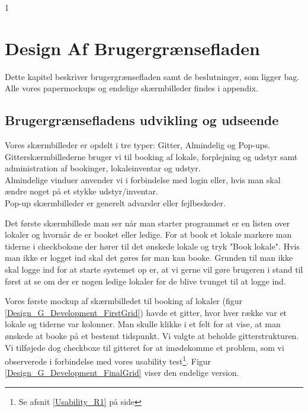 1\chapter{Design Af Brugergrænsefladen}
\label{Design_G}
Dette kapitel beskriver brugergrænsefladen samt de beslutninger, som ligger bag. Alle vores papermockups og endelige skærmbilleder findes i appendix.

\section{Brugergrænsefladens udvikling og udseende}
\label{Design_G_Development}
Vores skærmbilleder er opdelt i tre typer: Gitter, Almindelig og Pop-ups. 
\\Gitterskærmbillederne bruger vi til booking af lokale, forplejning og udstyr samt administration af bookinger, lokaleinventar og udstyr.
\\Almindelige vinduer anvender vi i forbindelse med login eller, hvis man skal ændre noget på et stykke udstyr/inventar.
\\Pop-up skærmbilleder er generelt advarsler eller fejlbeskeder.

Det første skærmbillede man ser når man starter programmet er en listen over lokaler og hvornår de er booket eller ledige. For at book et lokale markere man tiderne i checkboksne der hører til det ønskede lokale og tryk "Book lokale". Hvis man ikke er logget ind skal det gøres før man kan booke.
Grunden til man ikke skal  logge ind for at starte systemet op er, at vi gerne vil gøre brugeren i stand til først at se om der er nogen ledige lokaler før de blive tvunget til at logge ind.

Vores første mockup af skærmbilledet til booking af lokaler (figur \ref{Design_G_Development_FirstGrid}) havde et gitter, hvor hver række var et lokale og tiderne var kolonner. Man skulle klikke i et felt for at vise, at man ønskede at booke på et bestemt tidspunkt.
Vi valgte at beholde gitterstrukturen. Vi tilføjede dog checkboxe til gitteret for at imødekomme et problem, som vi observerede i forbindelse med vores usability test\footnote{Se afsnit \ref{Usability_R1} på side \pageref{Usability_R1}}. Figur \ref{Design_G_Development_FinalGrid} viser den endelige version.


